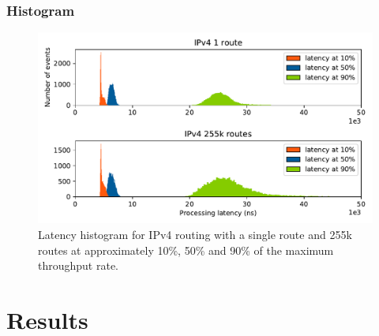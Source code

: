 \begin{frame}
    \frametitle{Histogram}
    \begin{figure}[!ht]
    \noindent\hspace{0.5mm}\includegraphics[width=\linewidth]{pics/latency_histogram_overview_ip4.pdf}
    \caption{Latency histogram for IPv4 routing with a single route and 255k routes at approximately 10\%, 50\% and 90\% of the maximum throughput rate. }
    \label{graph:latencyhistogram}
    \end{figure}
\end{frame}

\section{Results}



